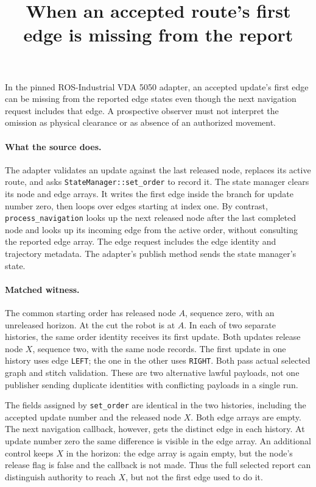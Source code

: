 \documentclass[11pt]{article}
\title{When an accepted route's first edge is missing from the report}
\begin{document}
\maketitle

In the pinned ROS-Industrial VDA 5050 adapter, an accepted update's
first edge can be missing from the reported edge states even though
the next navigation request includes that edge. A prospective
observer must not interpret the omission as physical clearance or
as absence of an authorized movement.

\paragraph{What the source does.}
The adapter validates an update against the last released node,
replaces its active route, and asks \texttt{StateManager::set\_order}
to record it. The state manager clears its node and edge arrays.
It writes the first edge inside the branch for update number zero,
then loops over edges starting at index one. By contrast,
\texttt{process\_navigation} looks up the next released node after
the last completed node and looks up its incoming edge from the
active order, without consulting the reported edge array. The edge
request includes the edge identity and trajectory metadata. The
adapter's publish method sends the state manager's state.

\paragraph{Matched witness.}
The common starting order has released node \(A\), sequence zero,
with an unreleased horizon. At the cut the robot is at \(A\).
In each of two separate histories, the same order identity receives
its first update. Both updates release node \(X\), sequence two,
with the same node records. The first update in one history uses
edge \texttt{LEFT}; the one in the other uses \texttt{RIGHT}.
Both pass actual selected graph and stitch validation. These are
two alternative lawful payloads, not one publisher sending duplicate
identities with conflicting payloads in a single run.

The fields assigned by \texttt{set\_order} are identical in the two
histories, including the accepted update number and the released
node \(X\). Both edge arrays are empty. The next navigation callback,
however, gets the distinct edge in each history. At update number
zero the same difference is visible in the edge array. An additional
control keeps \(X\) in the horizon: the edge array is again empty,
but the node's release flag is false and the callback is not made.
Thus the full selected report can distinguish authority to reach
\(X\), but not the first edge used to do it.
\end{document}

